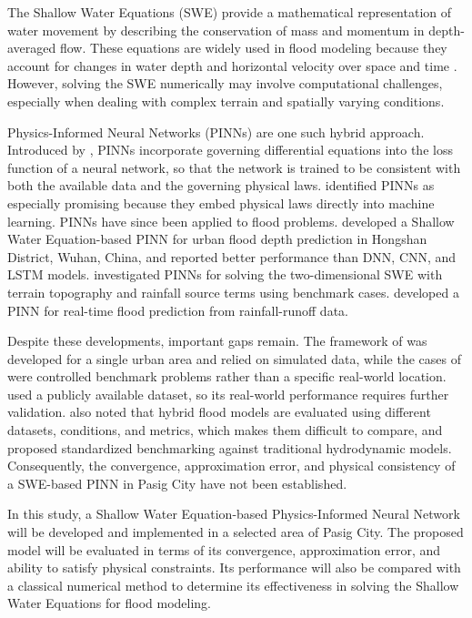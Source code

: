 The Shallow Water Equations (SWE) provide a mathematical representation of water movement by describing the conservation of mass and momentum in depth-averaged flow. These equations are widely used in flood modeling because they account for changes in water depth and horizontal velocity over space and time \cite{guo2021}. However, solving the SWE numerically may involve computational challenges, especially when dealing with complex terrain and spatially varying conditions.

Physics-Informed Neural Networks (PINNs) are one such hybrid approach. Introduced by , PINNs incorporate governing differential equations into the loss function of a neural network, so that the network is trained to be consistent with both the available data and the governing physical laws.  identified PINNs as especially promising because they embed physical laws directly into machine learning. PINNs have since been applied to flood problems.  developed a Shallow Water Equation-based PINN for urban flood depth prediction in Hongshan District, Wuhan, China, and reported better performance than DNN, CNN, and LSTM models.  investigated PINNs for solving the two-dimensional SWE with terrain topography and rainfall source terms using benchmark cases.  developed a PINN for real-time flood prediction from rainfall-runoff data.

Despite these developments, important gaps remain. The framework of  was developed for a single urban area and relied on simulated data, while the cases of  were controlled benchmark problems rather than a specific real-world location.  used a publicly available dataset, so its real-world performance requires further validation.  also noted that hybrid flood models are evaluated using different datasets, conditions, and metrics, which makes them difficult to compare, and proposed standardized benchmarking against traditional hydrodynamic models. Consequently, the convergence, approximation error, and physical consistency of a SWE-based PINN in Pasig City have not been established.

In this study, a Shallow Water Equation-based Physics-Informed Neural Network will be developed and implemented in a selected area of Pasig City. The proposed model will be evaluated in terms of its convergence, approximation error, and ability to satisfy physical constraints. Its performance will also be compared with a classical numerical method to determine its effectiveness in solving the Shallow Water Equations for flood modeling.

